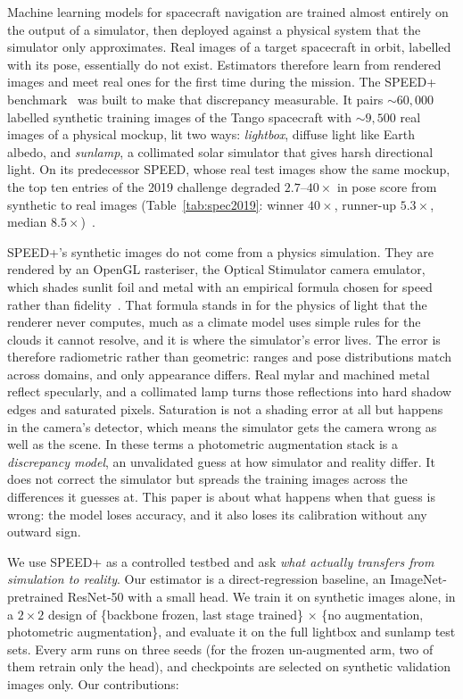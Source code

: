 \documentclass{article}
\begin{document}
Machine learning models for spacecraft navigation are trained almost entirely on the output
of a simulator, then deployed against a physical system that the simulator only approximates.
Real images of a target spacecraft in orbit, labelled with its pose, essentially do not
exist. Estimators therefore learn from rendered images and meet real ones for the first time
during the mission. The SPEED+ benchmark~\citep{park2022speedplus} was built to make that
discrepancy measurable. It pairs ${\sim}60{,}000$ labelled synthetic training images of the
Tango spacecraft with ${\sim}9{,}500$ real images of a physical mockup, lit two ways:
\emph{lightbox}, diffuse light like Earth albedo, and \emph{sunlamp}, a collimated solar
simulator that gives harsh directional light. On its predecessor SPEED, whose real test
images show the same mockup, the top ten entries of the 2019 challenge degraded
$2.7$--$40\times$ in pose score from synthetic to real images (Table~\ref{tab:spec2019}: winner
$40\times$, runner-up $5.3\times$, median $8.5\times$)~\citep{kisantal2020speed}.

SPEED+'s synthetic images do not come from a physics simulation. They are rendered by an
OpenGL rasteriser, the Optical Stimulator camera emulator, which shades sunlit foil and metal
with an empirical formula chosen for speed rather than fidelity~\citep{park2022speedplus}.
That formula stands in for the physics of light that the renderer never computes, much as a
climate model uses simple rules for the clouds it cannot resolve, and it is where the
simulator's error lives. The error is therefore radiometric rather than geometric: ranges and
pose distributions match across domains, and only appearance differs. Real mylar and machined
metal reflect specularly, and a collimated lamp turns those reflections into hard shadow edges
and saturated pixels. Saturation is not a shading error at all but happens in the camera's
detector, which means the simulator gets the camera wrong as well as the scene. In these
terms a photometric augmentation stack is a \emph{discrepancy model}, an unvalidated guess at
how simulator and reality differ. It does not correct the simulator but spreads the training
images across the differences it guesses at. This paper is about what happens when that guess
is wrong: the model loses accuracy, and it also loses its calibration without any outward
sign.

We use SPEED+ as a controlled testbed and ask \emph{what actually transfers from simulation
to reality}. Our estimator is a direct-regression baseline, an ImageNet-pretrained ResNet-50
with a small head. We train it on synthetic images alone, in a $2{\times}2$ design of
\{backbone frozen, last stage trained\} $\times$ \{no augmentation, photometric
augmentation\}, and evaluate it on the full lightbox and sunlamp test sets. Every arm runs on
three seeds (for the frozen un-augmented arm, two of them retrain only the head), and
checkpoints are selected on synthetic validation images only. Our contributions:
\end{document}
